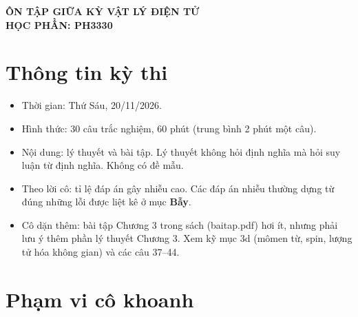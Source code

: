 \documentclass[11pt,a4paper]{article}
\begin{document}
\begin{center}
    {\Large\bfseries ÔN TẬP GIỮA KỲ VẬT LÝ ĐIỆN TỬ}\\[0.2cm]
    {\bfseries HỌC PHẦN: PH3330}
\end{center}
\vspace{0.2cm}

\section*{Thông tin kỳ thi}

\begin{itemize}
    \item Thời gian: Thứ Sáu, 20/11/2026.
    \item Hình thức: 30 câu trắc nghiệm, 60 phút (trung bình 2 phút một câu).
    \item Nội dung: lý thuyết và bài tập. Lý thuyết không hỏi định nghĩa mà hỏi suy luận từ định nghĩa. Không có đề mẫu.
    \item Theo lời cô: tỉ lệ đáp án gây nhiễu cao. Các đáp án nhiễu thường dựng từ đúng những lỗi được liệt kê ở mục \textbf{Bẫy}.
    \item Cô dặn thêm: bài tập Chương 3 trong sách (baitap.pdf) hơi ít, nhưng phải lưu ý thêm phần lý thuyết Chương 3. Xem kỹ mục 3d (mômen từ, spin, lượng tử hóa không gian) và các câu 37--44.
\end{itemize}

\section*{Phạm vi cô khoanh}
\end{document}
